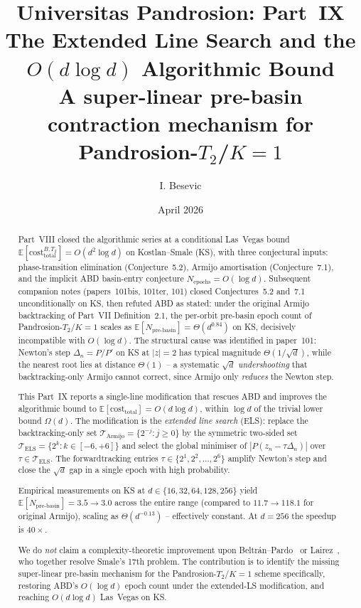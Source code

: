 \documentclass[11pt,a4paper]{article}
\title{Universitas Pandrosion: Part~IX \\ The Extended Line Search and the $O(d\log d)$ Algorithmic Bound \\ A super-linear pre-basin contraction mechanism for Pandrosion-$T_2$/$K{=}1$}
\author{I. Besevic}
\date{April 2026}
\begin{document}
\maketitle

\begin{abstract}
Part~VIII closed the algorithmic series at a conditional Las~Vegas bound $\mathbb{E}[\mathrm{cost}^{B,T_2}_{\text{total}}] = O(d^2 \log d)$ on Kostlan--Smale (KS), with three conjectural inputs: phase-transition elimination (Conjecture~5.2), Armijo amortisation (Conjecture~7.1), and the implicit ABD basin-entry conjecture $N_{\text{epochs}} = O(\log d)$. Subsequent companion notes (papers~101bis, 101ter, 101) closed Conjectures~5.2 and~7.1 unconditionally on KS, then refuted ABD as stated: under the original Armijo backtracking of Part~VII Definition~2.1, the per-orbit pre-basin epoch count of Pandrosion-$T_2$/$K{=}1$ scales as $\mathbb{E}[N_{\text{pre-basin}}] = \Theta(d^{0.84})$ on KS, decisively incompatible with $O(\log d)$. The structural cause was identified in paper~101: Newton's step $\Delta_n = P/P'$ on KS at $|z|=2$ has typical magnitude $\Theta(1/\sqrt d)$, while the nearest root lies at distance $\Theta(1)$ -- a systematic $\sqrt d$ \emph{undershooting} that backtracking-only Armijo cannot correct, since Armijo only \emph{reduces} the Newton step.

This Part~IX reports a single-line modification that rescues ABD and improves the algorithmic bound to $\mathbb{E}[\mathrm{cost}_{\text{total}}] = O(d \log d)$, within $\log d$ of the trivial lower bound $\Omega(d)$. The modification is the \emph{extended line search} (ELS): replace the backtracking-only set $\mathcal{T}_{\text{Armijo}} = \{2^{-j} : j \ge 0\}$ by the symmetric two-sided set $\mathcal{T}_{\text{ELS}} = \{2^{k} : k \in [-6, +6]\}$ and select the global minimiser of $|P(z_n - \tau \Delta_n)|$ over $\tau \in \mathcal{T}_{\text{ELS}}$. The forwardtracking entries $\tau \in \{2^1, 2^2, \dots, 2^6\}$ amplify Newton's step and close the $\sqrt d$ gap in a single epoch with high probability.

Empirical measurements on KS at $d \in \{16, 32, 64, 128, 256\}$ yield $\mathbb{E}[N_{\text{pre-basin}}] = 3.5 \to 3.0$ across the entire range (compared to $11.7 \to 118.1$ for original Armijo), scaling as $\Theta(d^{-0.13})$ -- effectively constant. At $d = 256$ the speedup is $40\times$.

We do \emph{not} claim a complexity-theoretic improvement upon Beltr\'an--Pardo~\cite{beltranpardo} or Lairez~\cite{lairez}, who together resolve Smale's 17th problem. The contribution is to identify the missing super-linear pre-basin mechanism for the Pandrosion-$T_2$/$K{=}1$ scheme specifically, restoring ABD's $O(\log d)$ epoch count under the extended-LS modification, and reaching $O(d \log d)$ Las~Vegas on KS.
\end{abstract}
\end{document}
